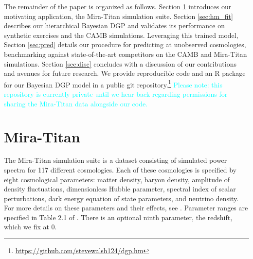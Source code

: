 \documentclass[11pt]{article}
\begin{document}
The remainder of the paper is organized as follows.  Section \ref{sec:data} 
introduces our motivating application, the Mira-Titan simulation suite.  
Section \ref{sec:hm_fit} describes our hierarchical Bayesian DGP and 
validates its performance on synthetic exercises and the CAMB simulations.  
Leveraging this trained model, Section \ref{sec:pred} details 
our procedure for predicting at unobserved cosmologies, benchmarking against
state-of-the-art competitors on the CAMB and Mira-Titan simulations. 
Section \ref{sec:disc} concludes with a discussion of our contributions and avenues for 
future research.  We provide reproducible code and an {\sf R} package for our 
Bayesian DGP model in a public git repository.\footnote{\url{https://github.com/stevewalsh124/dgp.hm}}
\textcolor{cyan}{Please note: this repository is currently private until we 
hear back regarding permissions for sharing the Mira-Titan data alongside our code.}



\section{Mira-Titan}
\label{sec:data}

The Mira-Titan simulation suite is a dataset consisting of simulated power spectra for 
117 different cosmologies. Each of these cosmologies is specified by eight cosmological 
parameters: matter density, baryon density, amplitude of density fluctuations, 
dimensionless Hubble parameter, spectral index of scalar perturbations,
dark energy equation of state parameters, and neutrino density. For more details 
on these parameters and their effects, see \cite{dodelson2020modern, aghanim2020planck, heitmann2016mira}. 
Parameter ranges are specified in Table 2.1 of \cite{moran2023mira}.
There is an optional ninth parameter, the redshift, which we fix at 0.
\end{document}
